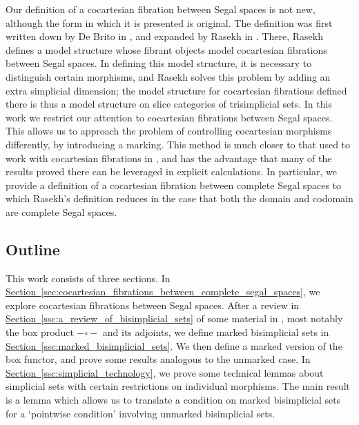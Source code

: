 \documentclass[main.tex]{subfiles}
\begin{document}
Our definition of a cocartesian fibration between Segal spaces is not new, although the form in which it is presented is original. The definition was first written down by De Brito in \cite{2016arXiv160500706B}, and expanded by Rasekh in \cite{rasekhcartesianfibrations}. There, Rasekh defines a model structure whose fibrant objects model cocartesian fibrations between Segal spaces. In defining this model structure, it is necessary to distinguish certain morphisms, and Rasekh solves this problem by adding an extra simplicial dimension; the model structure for cocartesian fibrations defined there is thus a model structure on slice categories of trisimplicial sets. In this work we restrict our attention to cocartesian fibrations between Segal spaces. This allows us to approach the problem of controlling cocartesian morphisms differently, by introducing a marking. This method is much closer to that used to work with cocartesian fibrations in \cite{highertopostheory}, and has the advantage that many of the results proved there can be leveraged in explicit calculations. In particular, we provide a definition of a cocartesian fibration between complete Segal spaces to which Rasekh's definition reduces in the case that both the domain and codomain are complete Segal spaces.

\subsection{Outline}
\label{ssc:outline}

This work consists of three sections. In \hyperref[sec:cocartesian_fibrations_between_complete_segal_spaces]{Section~\ref*{sec:cocartesian_fibrations_between_complete_segal_spaces}}, we explore cocartesian fibrations between Segal spaces. After a review in \hyperref[ssc:a_review_of_bisimplicial_sets]{Section~\ref*{ssc:a_review_of_bisimplicial_sets}} of some material in \cite{qcats_vs_segal_spaces}, most notably the box product $- \square -$ and its adjoints, we define marked bisimplicial sets in \hyperref[ssc:marked_bisimplicial_sets]{Section~\ref*{ssc:marked_bisimplicial_sets}}. We then define a marked version of the box functor, and prove some results analogous to the unmarked case. In \hyperref[ssc:simplicial_technology]{Section~\ref*{ssc:simplicial_technology}}, we prove some technical lemmas about simplicial sets with certain restrictions on individual morphisms. The main result is a lemma which allows us to translate a condition on marked bisimplicial sets for a `pointwise condition' involving unmarked bisimplicial sets.
\end{document}
